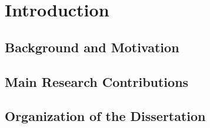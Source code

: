 
\chapter{Introduction} %

\label{Chapter1} %




\section{Background and Motivation}
\label{chap1:sec1}


\section{Main Research Contributions}
\label{chap1:sec2}


\section{Organization of the Dissertation}
\label{chap1:sec3}
